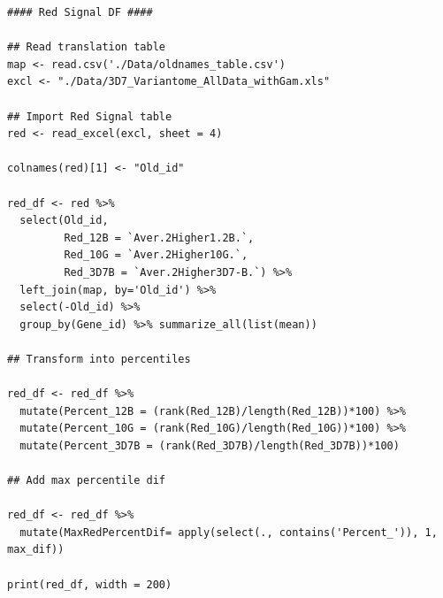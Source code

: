 \documentclass[11pt]{article}
\begin{document}
\begin{verbatim}
#### Red Signal DF ####

## Read translation table
map <- read.csv('./Data/oldnames_table.csv')
excl <- "./Data/3D7_Variantome_AllData_withGam.xls"

## Import Red Signal table
red <- read_excel(excl, sheet = 4)

colnames(red)[1] <- "Old_id"

red_df <- red %>%
  select(Old_id,
         Red_12B = `Aver.2Higher1.2B.`,
         Red_10G = `Aver.2Higher10G.`,
         Red_3D7B = `Aver.2Higher3D7-B.`) %>%
  left_join(map, by='Old_id') %>%
  select(-Old_id) %>%
  group_by(Gene_id) %>% summarize_all(list(mean))

## Transform into percentiles

red_df <- red_df %>%
  mutate(Percent_12B = (rank(Red_12B)/length(Red_12B))*100) %>%
  mutate(Percent_10G = (rank(Red_10G)/length(Red_10G))*100) %>%
  mutate(Percent_3D7B = (rank(Red_3D7B)/length(Red_3D7B))*100)

## Add max percentile dif

red_df <- red_df %>%
  mutate(MaxRedPercentDif= apply(select(., contains('Percent_')), 1, max_dif))

print(red_df, width = 200)
\end{verbatim}
\end{document}
